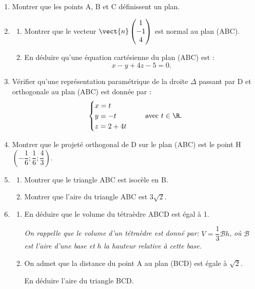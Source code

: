 	\begin{enumerate}
		\item Montrer que les points A, B et C définissent un plan.
		\item \begin{enumerate}
			\item Montrer que le vecteur $\vect{n} \begin{pmatrix} 1 \\ -1 \\ 4 \end{pmatrix} $ est normal au plan (ABC).

			\item En déduire qu'une équation cartésienne du plan (ABC) est :
			\[x-y+4 z-5=0.\]
		\end{enumerate}

		\item Vérifier qu'une représentation paramétrique de la droite $\Delta$ passant par D et orthogonale au plan (ABC) est donnée par :
		\[\begin{cases}
			x=t \\
			y=-t \\
			z=2+4 t
		\end{cases} \quad \text { avec } t \in \R.\]
		\item Montrer que le projeté orthogonal de D sur le plan (ABC) est le point H$\left(-\dfrac{1}{6} ; \dfrac{1}{6} ; \dfrac{4}{3}\right)$.
		\item \begin{enumerate}
			\item Montrer que le triangle ABC est isocèle en B.

			\item Montrer que l'aire du triangle ABC est $3 \sqrt{2}$.
		\end{enumerate}

		\item \begin{enumerate}
			\item En déduire que le volume du tétraèdre ABCD est égal à 1.

			\emph{On rappelle que le volume d'un tétraèdre est donné par:} \quad $V=\dfrac{1}{3} \mathcal{B} h$,\quad \emph{ où } $\mathcal{B}$ \emph{est l'aire d'une base et} $h$ \emph{la hauteur relative à cette base.}

			\item On admet que la distance du point A au plan (BCD) est égale à $\sqrt{2}$.

			En déduire l'aire du triangle BCD.
		\end{enumerate}


\end{enumerate}
